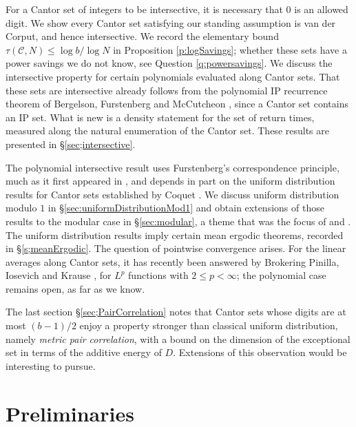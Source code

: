 \documentclass[12pt]{amsart}
\numberwithin{equation}{section}
\theoremstyle{definition}
\begin{document}
For a Cantor set of integers to be intersective, it is necessary that $0$ is an allowed digit. We show every Cantor set satisfying our standing assumption is van der Corput, and hence intersective. We record the elementary bound $\tau(\mathcal C,N)\leq \log b/\log N$ in Proposition \ref{p:logSavings}; whether these sets have a power savings we do not know, see Question \ref{q:powersavings}.  
We discuss the intersective property for certain polynomials evaluated along Cantor sets. 
That these sets are intersective already follows from the polynomial IP recurrence theorem of Bergelson, Furstenberg and McCutcheon \cite{MR1417769}, since a Cantor set contains an IP set. 
What is new is a density statement for the set of return times, measured along the natural enumeration of the Cantor set.  
These results are presented in \S \ref{sec;intersective}.  

The polynomial intersective result uses Furstenberg's correspondence principle, 
much as it first appeared in \cite{MR0498471}, and depends in part on the uniform distribution results for Cantor sets established by Coquet 
\cites{MR506123,MR578819}. We discuss uniform distribution modulo $1$ in \S\ref{sec:uniformDistributionMod1} and obtain extensions of those results to the modular case in \S\ref{sec:modular}, a theme that was the focus of \cite{ERDOS199899} and \cite{SAAVEDRA-ARAYA_2026}.   
The uniform distribution results imply certain mean ergodic theorems, recorded in \S\ref{s;meanErgodic}.  The question of pointwise convergence arises. For the linear averages along Cantor sets, it has recently been answered by Brokering Pinilla, Iosevich and Krause \cite{pinilla2026pointwiseconvergenceergodicaverages}, for $L^p$ functions with $2\leq p<\infty$; the polynomial case remains open, as far as we know. 

The last section \S\ref{sec;PairCorrelation} notes that Cantor sets whose digits are at most $(b-1)/2$ enjoy a property stronger than classical uniform distribution, namely \emph{metric pair correlation}, with a bound on the dimension of the exceptional set in terms of the additive energy of $D$. 
Extensions of this observation would be interesting to pursue.  


\smallskip 


 

\section{Preliminaries}
\end{document}

